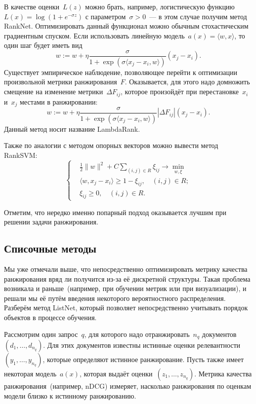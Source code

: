 \documentclass[12pt,fleqn]{article}
\begin{document}
В качестве оценки~$L(z)$ можно брать, например, логистическую функцию~$L(x) = \log(1 + e^{-\sigma z})$ с параметром~$\sigma > 0$~---
в этом случае получим метод RankNet.
Оптимизировать данный функционал можно обычным стохастическим градиентным спуском.
Если использовать линейную модель~$a(x) = \langle w, x \rangle$, то один шаг будет иметь вид
\[
    w
    :=
    w
    +
    \eta
    \frac{
        \sigma
    }{
        1 + \exp(
            \sigma
            \langle x_j - x_i, w \rangle
        )
    }
    (x_j - x_i).
\]
Существует эмпирическое наблюдение, позволяющее перейти к оптимизации произвольной метрики ранжирования~$F$.
Оказывается, для этого надо домножить смещение на изменение метрики~$\Delta F_{ij}$, которое произойдёт при перестановке~$x_i$ и~$x_j$
местами в ранжировании:
\[
    w
    :=
    w
    +
    \eta
    \frac{
        \sigma
    }{
        1 + \exp(
            \sigma
            \langle x_j - x_i, w \rangle
        )
    }
    |\Delta F_{ij}|
    (x_j - x_i).
\]
Данный метод носит название LambdaRank.


Также по аналогии с методом опорных векторов можно вывести метод RankSVM:
\[
    \left\{
    \begin{aligned}
        &\frac{1}{2} \|w\|^2 + C \sum_{(i, j) \in R} \xi_{ij} \to \min_{w, \xi}\\
        &\langle w, x_j - x_i \rangle \geq 1 - \xi_{ij}, \quad (i, j) \in R;\\
        &\xi_{ij} \geq 0, \quad (i, j) \in R.
    \end{aligned}
    \right.
\]

Отметим, что нередко именно попарный подход оказывается лучшим при решении задачи ранжирования.

\subsection{Списочные методы}

Мы уже отмечали выше, что непосредственно оптимизировать метрику качества ранжирования вряд ли
получится из-за её дискретной структуры.
Такая проблема возникала и раньше~(например, при обучении метрик или при визуализации),
и решали мы её путём введения некоторого вероятностного распределения.
Разберём метод ListNet, который позволяет непосредственно учитывать порядок
объектов в процессе обучения.

Рассмотрим один запрос~$q$, для которого надо отранжировать~$n_q$ документов~$(d_1, \dots, d_{n_q})$.
Для этих документов известны истинные оценки релевантности~$(y_1, \dots, y_{n_q})$,
которые определяют истинное ранжирование.
Пусть также имеет некоторая модель~$a(x)$, которая выдаёт оценки~$(z_1, \dots, z_{n_q})$.
Метрика качества ранжирования~(например, nDCG) измеряет, насколько ранжирования по оценкам модели
близко к истинному ранжированию.
\end{document}
